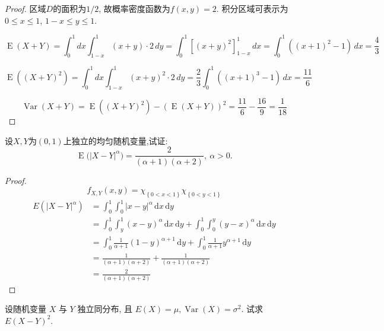 \documentclass[../main.tex]{subfiles}
\begin{document}
\begin{proof}
 区域\(D\)的面积为\(1/2\), 故概率密度函数为\(f(x,y)=2\). 积分区域可表示为\(0 \le x \le 1\), \(1-x \le y \le 1\).

\[
\operatorname{E}(X+Y) = \int_{0}^{1} dx \int_{1-x}^{1} (x+y) \cdot 2 \, dy = \int_{0}^{1} \left[ (x+y)^2 \right]_{1-x}^{1} \, dx = \int_{0}^{1} ((x+1)^2 - 1) \, dx = \frac{4}{3}
\]


\[
\operatorname{E}((X+Y)^2) = \int_{0}^{1} dx \int_{1-x}^{1} (x+y)^2 \cdot 2 \, dy = \frac{2}{3} \int_{0}^{1} ((x+1)^3 - 1) \, dx = \frac{11}{6}
\]


\[
\operatorname{Var}(X+Y) = \operatorname{E}((X+Y)^2) - (\operatorname{E}(X+Y))^2 = \frac{11}{6} - \frac{16}{9} = \frac{1}{18}
\]
\end{proof}

\begin{exercise}{}{}
设\(X,Y\)为\((0,1)\)上独立的均匀随机变量,试证:
\[
\operatorname{E}\bigl(|X-Y|^{\alpha}\bigr)=\frac{2}{(\alpha+1)(\alpha+2)},\ \alpha>0.
\]
\end{exercise}

\begin{proof}
  \[
 f_{X,Y}\left( x,y \right)= \chi_{\left\{ 0< x< 1 \right\}} \chi _{\left\{ 0< y< 1 \right\}}
  \] \[\begin{aligned}
  E\left( \left| X-Y \right|^{\alpha }  \right)&=  \int _{0}^{1}\int_{0}^{1}\left| x-y \right|^{\alpha }\,\mathrm{d} x\,\mathrm{d} y\\ 
   &=\int_{0}^{1}\int_{y}^{1}\left( x-y \right)^{\alpha }\,\mathrm{d} x\,\mathrm{d} y+ \int_{0}^{1}\int_{0}^{y}\left( y-x \right)^{\alpha }\,\mathrm{d} x\,\mathrm{d} y   \\ 
    &= \int_{0}^{1}\frac{1 }{\alpha + 1 }\left( 1-y \right)^{\alpha + 1}\,\mathrm{d} y+   \int_{0}^{1} \frac{1 }{\alpha + 1 }y^{\alpha + 1} \,\mathrm{d} y\\ 
     &= \frac{1 }{\left( \alpha + 1 \right)\left(  \alpha + 2 \right)   }+ \frac{1 }{\left(  \alpha + 1 \right)\left(  \alpha + 2 \right)   }\\ 
      &= \frac{2 }{\left(  \alpha + 1 \right)\left(  \alpha  + 2\right)   }   
  \end{aligned} 
  \]
\end{proof}

\begin{exercise}{}{}
设随机变量 $X$ 与 $Y$ 独立同分布, 且 $E(X)=\mu, \operatorname{Var}(X)=\sigma^2$. 试求 $E(X-Y)^2$.
\end{exercise}
\end{document}
